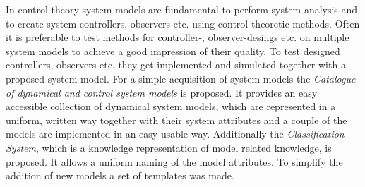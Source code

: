 \documentclass[arbeit=studie, oneside, BCOR=12mm]{ArbeitRST}
\begin{document}
{In control theory system models are fundamental to perform system analysis and to create system controllers, observers etc. using control theoretic methods. Often it is preferable to test methods for controller-, observer-desings etc. on multiple system models to achieve a good impression of their quality. To test designed controllers, observers etc. they get implemented and simulated together with a proposed system model. For a simple acquisition of system models the \textit{Catalogue of dynamical and control system models} is proposed. It provides an easy accessible collection of dynamical system models, which are represented in a uniform, written way together with their system attributes and a couple of the models are implemented in an easy usable way. Additionally the \textit{Classification System}, which is a knowledge representation of model related knowledge, is proposed. It allows a uniform naming of the model attributes. To simplify the addition of new models a set of templates was made.}%


\tableofcontents



\listoffigures


\listoftables



\pagestyle{scrheadings}

\end{document}
